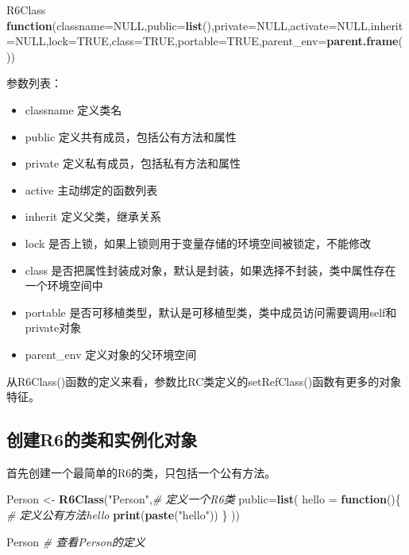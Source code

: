 \documentclass[]{book}
\newenvironment{Shaded}{\begin{snugshade}}{\end{snugshade}}
\newcommand{\KeywordTok}[1]{\textcolor[rgb]{0.13,0.29,0.53}{\textbf{#1}}}
\newcommand{\DataTypeTok}[1]{\textcolor[rgb]{0.13,0.29,0.53}{#1}}
\newcommand{\StringTok}[1]{\textcolor[rgb]{0.31,0.60,0.02}{#1}}
\newcommand{\CommentTok}[1]{\textcolor[rgb]{0.56,0.35,0.01}{\textit{#1}}}
\newcommand{\OtherTok}[1]{\textcolor[rgb]{0.56,0.35,0.01}{#1}}
\newcommand{\ControlFlowTok}[1]{\textcolor[rgb]{0.13,0.29,0.53}{\textbf{#1}}}
\newcommand{\NormalTok}[1]{#1}
\begin{document}
\begin{Shaded}
\begin{Highlighting}[]
\NormalTok{R6Class}
\ControlFlowTok{function}\NormalTok{(}\DataTypeTok{classname=}\OtherTok{NULL}\NormalTok{,}\DataTypeTok{public=}\KeywordTok{list}\NormalTok{(),}\DataTypeTok{private=}\OtherTok{NULL}\NormalTok{,}\DataTypeTok{activate=}\OtherTok{NULL}\NormalTok{,}\DataTypeTok{inherit=}\OtherTok{NULL}\NormalTok{,}\DataTypeTok{lock=}\OtherTok{TRUE}\NormalTok{,}\DataTypeTok{class=}\OtherTok{TRUE}\NormalTok{,}\DataTypeTok{portable=}\OtherTok{TRUE}\NormalTok{,}\DataTypeTok{parent_env=}\KeywordTok{parent.frame}\NormalTok{())}
\end{Highlighting}
\end{Shaded}

参数列表：

\begin{itemize}
\item
  classname 定义类名
\item
  public 定义共有成员，包括公有方法和属性
\item
  private 定义私有成员，包括私有方法和属性
\item
  active 主动绑定的函数列表
\item
  inherit 定义父类，继承关系
\item
  lock 是否上锁，如果上锁则用于变量存储的环境空间被锁定，不能修改
\item
  class
  是否把属性封装成对象，默认是封装，如果选择不封装，类中属性存在一个环境空间中
\item
  portable
  是否可移植类型，默认是可移植型类，类中成员访问需要调用self和private对象
\item
  parent\_env 定义对象的父环境空间
\end{itemize}

从R6Class()函数的定义来看，参数比RC类定义的setRefClass()函数有更多的对象特征。

\subsection{创建R6的类和实例化对象}\label{r6}

首先创建一个最简单的R6的类，只包括一个公有方法。

\begin{Shaded}
\begin{Highlighting}[]
\NormalTok{Person <-}\StringTok{ }\KeywordTok{R6Class}\NormalTok{(}\StringTok{"Person"}\NormalTok{,}\CommentTok{# 定义一个R6类}
                  \DataTypeTok{public=}\KeywordTok{list}\NormalTok{(}
                    \DataTypeTok{hello =} \ControlFlowTok{function}\NormalTok{()\{ }\CommentTok{# 定义公有方法hello}
                      \KeywordTok{print}\NormalTok{(}\KeywordTok{paste}\NormalTok{(}\StringTok{"hello"}\NormalTok{))}
\NormalTok{                    \}}
\NormalTok{                  ))}

\NormalTok{Person }\CommentTok{# 查看Person的定义}
\end{Highlighting}
\end{Shaded}
\end{document}
